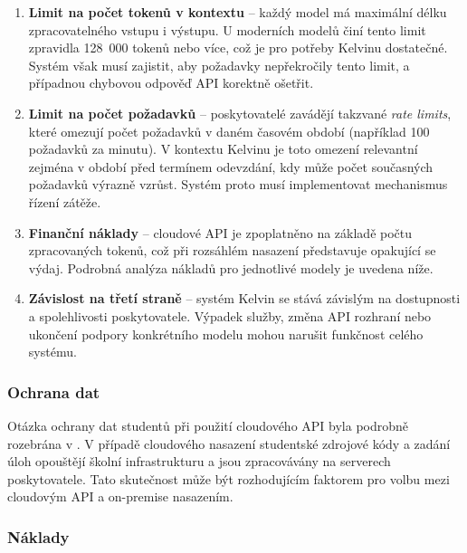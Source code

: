 \begin{enumerate}
    \item \textbf{Limit na počet tokenů v kontextu} -- každý model má maximální délku zpracovatelného vstupu i výstupu.
    U moderních modelů činí tento limit zpravidla 128~000 tokenů nebo více, což je pro potřeby Kelvinu dostatečné.
    Systém však musí zajistit, aby požadavky nepřekročily tento limit, a případnou chybovou odpověď API korektně ošetřit.

    \item \textbf{Limit na počet požadavků} -- poskytovatelé zavádějí takzvané \textit{rate limits}, které omezují počet požadavků v daném časovém období (například 100 požadavků za minutu).
    V kontextu Kelvinu je toto omezení relevantní zejména v období před termínem odevzdání, kdy může počet současných požadavků výrazně vzrůst.
    Systém proto musí implementovat mechanismus řízení zátěže.

    \item \textbf{Finanční náklady} -- cloudové API je zpoplatněno na základě počtu zpracovaných tokenů, což při rozsáhlém nasazení představuje opakující se výdaj.
    Podrobná analýza nákladů pro jednotlivé modely je uvedena níže.

    \item \textbf{Závislost na třetí straně} -- systém Kelvin se stává závislým na dostupnosti a spolehlivosti poskytovatele.
    Výpadek služby, změna API rozhraní nebo ukončení podpory konkrétního modelu mohou narušit funkčnost celého systému.
\end{enumerate}

\subsubsection*{Ochrana dat}
\label{subsubsec:deployment-cloud-data-protection}

Otázka ochrany dat studentů při použití cloudového API byla podrobně rozebrána v .
V případě cloudového nasazení studentské zdrojové kódy a zadání úloh opouštějí školní infrastrukturu a jsou zpracovávány na serverech poskytovatele.
Tato skutečnost může být rozhodujícím faktorem pro volbu mezi cloudovým API a on-premise nasazením.

\subsubsection*{Náklady}
\label{subsubsec:deployment-cloud-costs}

